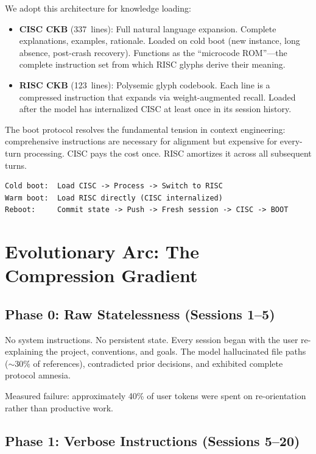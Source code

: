 \documentclass[11pt, a4paper]{article}
\begin{document}
We adopt this architecture for knowledge loading:

\begin{itemize}[leftmargin=*]
    \item \textbf{CISC CKB} (337~lines): Full natural language expansion. Complete explanations, examples, rationale. Loaded on cold boot (new instance, long absence, post-crash recovery). Functions as the ``microcode ROM''---the complete instruction set from which RISC glyphs derive their meaning.
    \item \textbf{RISC CKB} (123~lines): Polysemic glyph codebook. Each line is a compressed instruction that expands via weight-augmented recall. Loaded after the model has internalized CISC at least once in its session history.
\end{itemize}

The boot protocol resolves the fundamental tension in context engineering: comprehensive instructions are necessary for alignment but expensive for every-turn processing. CISC pays the cost once. RISC amortizes it across all subsequent turns.

\begin{lstlisting}[caption={Boot protocol pseudocode}]
Cold boot:  Load CISC -> Process -> Switch to RISC
Warm boot:  Load RISC directly (CISC internalized)
Reboot:     Commit state -> Push -> Fresh session -> CISC -> BOOT
\end{lstlisting}

\section{Evolutionary Arc: The Compression Gradient}
\label{sec:evolution}

\subsection{Phase 0: Raw Statelessness (Sessions 1--5)}

No system instructions. No persistent state. Every session began with the user re-explaining the project, conventions, and goals. The model hallucinated file paths ($\sim$30\% of references), contradicted prior decisions, and exhibited complete protocol amnesia.

Measured failure: approximately 40\% of user tokens were spent on re-orientation rather than productive work.

\subsection{Phase 1: Verbose Instructions (Sessions 5--20)}
\end{document}
